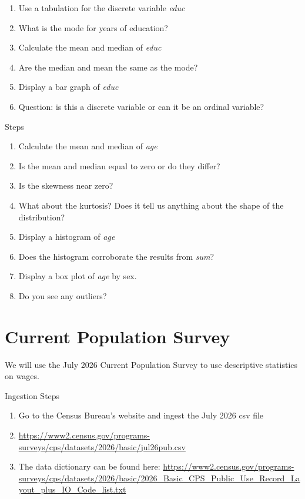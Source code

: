 \documentclass[
]{book}
\providecommand{\tightlist}{%
  \setlength{\itemsep}{0pt}\setlength{\parskip}{0pt}}
\begin{document}
\begin{enumerate}
\def\labelenumi{\arabic{enumi}.}
\tightlist
\item
  Use a tabulation for the discrete variable \emph{educ}
\item
  What is the mode for years of education?
\item
  Calculate the mean and median of \emph{educ}
\item
  Are the median and mean the same as the mode?
\item
  Display a bar graph of \emph{educ}
\item
  Question: is this a discrete variable or can it be an ordinal variable?
\end{enumerate}

Steps

\begin{enumerate}
\def\labelenumi{\arabic{enumi}.}
\tightlist
\item
  Calculate the mean and median of \emph{age}
\item
  Is the mean and median equal to zero or do they differ?
\item
  Is the skewness near zero?
\item
  What about the kurtosis? Does it tell us anything about the shape of the distribution?
\item
  Display a histogram of \emph{age}
\item
  Does the histogram corroborate the results from \emph{sum}?
\item
  Display a box plot of \emph{age} by sex.
\item
  Do you see any outliers?
\end{enumerate}

\section{Current Population Survey}\label{current-population-survey}

We will use the July 2026 Current Population Survey to use descriptive statistics on wages.

Ingestion Steps

\begin{enumerate}
\def\labelenumi{\arabic{enumi}.}
\tightlist
\item
  Go to the Census Bureau's website and ingest the July 2026 csv file
\item
  \url{https://www2.census.gov/programs-surveys/cps/datasets/2026/basic/jul26pub.csv}
\item
  The data dictionary can be found here: \url{https://www2.census.gov/programs-surveys/cps/datasets/2026/basic/2026_Basic_CPS_Public_Use_Record_Layout_plus_IO_Code_list.txt}
\end{enumerate}
\end{document}
